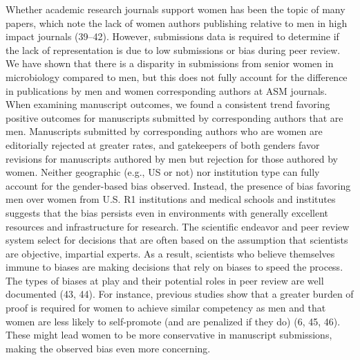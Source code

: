 \documentclass[11pt,]{article}
\begin{document}
Whether academic research journals support women has been the topic of
many papers, which note the lack of women authors publishing relative to
men in high impact journals (39--42). However, submissions data is
required to determine if the lack of representation is due to low
submissions or bias during peer review. We have shown that there is a
disparity in submissions from senior women in microbiology compared to
men, but this does not fully account for the difference in publications
by men and women corresponding authors at ASM journals. When examining
manuscript outcomes, we found a consistent trend favoring positive
outcomes for manuscripts submitted by corresponding authors that are
men. Manuscripts submitted by corresponding authors who are women are
editorially rejected at greater rates, and gatekeepers of both genders
favor revisions for manuscripts authored by men but rejection for those
authored by women. Neither geographic (e.g., US or not) nor institution
type can fully account for the gender-based bias observed. Instead, the
presence of bias favoring men over women from U.S. R1 institutions and
medical schools and institutes suggests that the bias persists even in
environments with generally excellent resources and infrastructure for
research. The scientific endeavor and peer review system select for
decisions that are often based on the assumption that scientists are
objective, impartial experts. As a result, scientists who believe
themselves immune to biases are making decisions that rely on biases to
speed the process. The types of biases at play and their potential roles
in peer review are well documented (43, 44). For instance, previous
studies show that a greater burden of proof is required for women to
achieve similar competency as men and that women are less likely to
self-promote (and are penalized if they do) (6, 45, 46). These might
lead women to be more conservative in manuscript submissions, making the
observed bias even more concerning.
\end{document}
